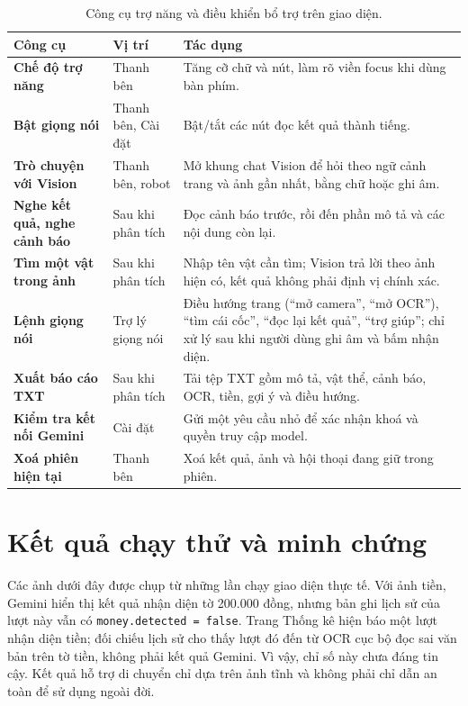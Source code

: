 \begin{table}[H]
\centering
\small\linespread{1.05}\selectfont
\caption{Công cụ trợ năng và điều khiển bổ trợ trên giao diện.}
\label{tab:congcu-trogiup}
\begin{tabular*}{\textwidth}{@{\extracolsep{\fill}}>{\raggedright\arraybackslash\bfseries\color{daunavy}}p{3.3cm} >{\raggedright\arraybackslash}p{3.0cm} >{\raggedright\arraybackslash}p{8.0cm}}
\toprule
\rowcolor{gray100}
Công cụ & Vị trí & Tác dụng \\
\midrule
Chế độ trợ năng & Thanh bên & Tăng cỡ chữ và nút, làm rõ viền focus khi dùng bàn phím. \\
Bật giọng nói & Thanh bên, Cài đặt & Bật/tắt các nút đọc kết quả thành tiếng. \\
Trò chuyện với Vision & Thanh bên, robot & Mở khung chat Vision để hỏi theo ngữ cảnh trang và ảnh gần nhất, bằng chữ hoặc ghi âm. \\
Nghe kết quả, nghe cảnh báo & Sau khi phân tích & Đọc cảnh báo trước, rồi đến phần mô tả và các nội dung còn lại. \\
Tìm một vật trong ảnh & Sau khi phân tích & Nhập tên vật cần tìm; Vision trả lời theo ảnh hiện có, kết quả không phải định vị chính xác. \\
Lệnh giọng nói & Trợ lý giọng nói & Điều hướng trang (``mở camera'', ``mở OCR''), ``tìm cái cốc'', ``đọc lại kết quả'', ``trợ giúp''; chỉ xử lý sau khi người dùng ghi âm và bấm nhận diện. \\
Xuất báo cáo TXT & Sau khi phân tích & Tải tệp TXT gồm mô tả, vật thể, cảnh báo, OCR, tiền, gợi ý và điều hướng. \\
Kiểm tra kết nối Gemini & Cài đặt & Gửi một yêu cầu nhỏ để xác nhận khoá và quyền truy cập model. \\
Xoá phiên hiện tại & Thanh bên & Xoá kết quả, ảnh và hội thoại đang giữ trong phiên. \\
\bottomrule
\end{tabular*}
\end{table}

\section{Kết quả chạy thử và minh chứng}

Các ảnh dưới đây được chụp từ những lần chạy giao diện thực tế. Với ảnh tiền,
Gemini hiển thị kết quả nhận diện tờ 200.000 đồng, nhưng bản ghi lịch sử của
lượt này vẫn có \texttt{money.detected = false}. Trang Thống kê hiện báo một
lượt nhận diện tiền; đối chiếu lịch sử cho thấy lượt đó đến từ OCR cục bộ đọc
sai văn bản trên tờ tiền, không phải kết quả Gemini. Vì vậy, chỉ số này chưa
đáng tin cậy. Kết quả hỗ trợ di chuyển chỉ dựa trên ảnh tĩnh và không phải
chỉ dẫn an toàn để sử dụng ngoài đời.

